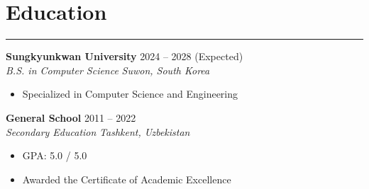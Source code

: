 \documentclass[letterpaper, 10pt]{article}
\begin{document}
\section*{Education}
\hrule
\vspace{4pt}
\textbf{Sungkyunkwan University} \hfill 2024 -- 2028 (Expected) \\
\textit{B.S. in Computer Science} \hfill \textit{Suwon, South Korea}
\begin{itemize}
    \item Specialized in Computer Science and Engineering
\end{itemize}
\textbf{General School} \hfill 2011 -- 2022 \\
\textit{Secondary Education} \hfill \textit{Tashkent, Uzbekistan}
\begin{itemize}
    \item GPA: 5.0 / 5.0
    \item Awarded the Certificate of Academic Excellence
\end{itemize}
\end{document}
